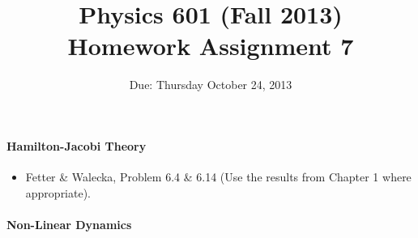 \documentclass[letterpaper,11pt]{article}
\title{Physics 601 (Fall 2013) \\ Homework Assignment 7}
\date{Due: Thursday October 24, 2013}
\begin{document}
\maketitle

\paragraph*{Hamilton-Jacobi Theory}
\begin{itemize}
 \item Fetter \& Walecka, Problem 6.4 \& 6.14 (Use the results from Chapter 1 where appropriate).
\end{itemize}

\paragraph*{Non-Linear Dynamics}
\end{document}
